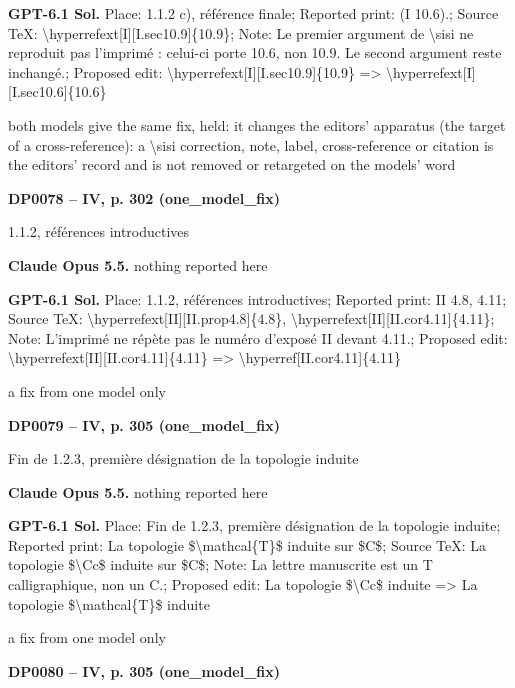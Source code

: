 \textbf{GPT-6.1 Sol.} Place: 1.1.2 c), référence finale; Reported print: (I 10.6).; Source TeX: \textbackslash{}hyperrefext[I][I.sec10.9]\{10.9\}; Note: Le premier argument de \textbackslash{}sisi ne reproduit pas l'imprimé : celui-ci porte 10.6, non 10.9. Le second argument reste inchangé.; Proposed edit: \textbackslash{}hyperrefext[I][I.sec10.9]\{10.9\} =\allowbreak > \textbackslash{}hyperrefext[I][I.sec10.6]\{10.6\}\par
both models give the same fix, held: it changes the editors' apparatus (the target of a cross-reference): a \textbackslash{}sisi correction, note, label, cross-reference or citation is the editors' record and is not removed or retargeted on the models' word\par
\par\noindent\hypertarget{DP0078}{}\textbf{DP0078 -- IV, p. 302 (one\_model\_fix)}\par
1.1.2, références introductives\par
\textbf{Claude Opus 5.5.} nothing reported here\par
\textbf{GPT-6.1 Sol.} Place: 1.1.2, références introductives; Reported print: II 4.8, 4.11; Source TeX: \textbackslash{}hyperrefext[II][II.prop4.8]\{4.8\}, \textbackslash{}hyperrefext[II][II.cor4.11]\{4.11\}; Note: L'imprimé ne répète pas le numéro d'exposé II devant 4.11.; Proposed edit: \textbackslash{}hyperrefext[II][II.cor4.11]\{4.11\} =\allowbreak > \textbackslash{}hyperref[II.cor4.11]\{4.11\}\par
a fix from one model only\par
\par\noindent\hypertarget{DP0079}{}\textbf{DP0079 -- IV, p. 305 (one\_model\_fix)}\par
Fin de 1.2.3, première désignation de la topologie induite\par
\textbf{Claude Opus 5.5.} nothing reported here\par
\textbf{GPT-6.1 Sol.} Place: Fin de 1.2.3, première désignation de la topologie induite; Reported print: La topologie \$\textbackslash{}mathcal\{T\}\$ induite sur \$C\$; Source TeX: La topologie \$\textbackslash{}Cc\$ induite sur \$C\$; Note: La lettre manuscrite est un T calligraphique, non un C.; Proposed edit: La topologie \$\textbackslash{}Cc\$ induite =\allowbreak > La topologie \$\textbackslash{}mathcal\{T\}\$ induite\par
a fix from one model only\par
\par\noindent\hypertarget{DP0080}{}\textbf{DP0080 -- IV, p. 305 (one\_model\_fix)}\par
